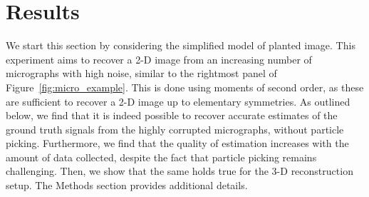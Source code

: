 \documentclass[english,11pt]{article}
\newcommand{\1}{\mathbf{1}}
\numberwithin{equation}{section}
\theoremstyle{plain}
\theoremstyle{definition}
\theoremstyle{remark}
\theoremstyle{plain}
\theoremstyle{remark}
\theoremstyle{plain}
\theoremstyle{plain}
\begin{document}
\section{Results} \label{sec:results}

We start this section by considering the simplified model of planted image. This experiment aims to recover a 2-D image from an increasing number of micrographs with high noise, similar to the rightmost panel of Figure~\ref{fig:micro_example}. This is done using moments of second order, as these are sufficient to recover a 2-D image up to elementary symmetries. 
As outlined below, we find that it is indeed possible to recover accurate estimates of the ground truth signals from the highly corrupted micrographs, without particle picking. Furthermore, we find that the quality of estimation increases with the amount of data collected, despite the fact that particle picking remains challenging.
Then, we  show that the same holds true for the 3-D reconstruction setup.
 The Methods section provides additional details. 


\end{document}
